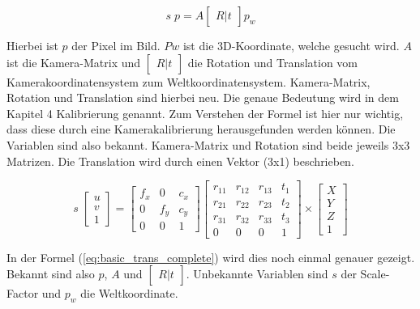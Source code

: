 	\begin{equation}
		s \; p = A \begin{bmatrix} R|t \end{bmatrix} p_w
		\label{eq:basic_trans}
	\end{equation}
	
	Hierbei ist \( p \) der Pixel im Bild. \( Pw \) ist die 3D-Koordinate, welche gesucht wird. \( A \) ist die Kamera-Matrix und \( \begin{bmatrix} R|t \end{bmatrix} \) die Rotation und Translation vom Kamerakoordinatensystem zum Weltkoordinatensystem. Kamera-Matrix, Rotation und Translation sind hierbei neu. Die genaue Bedeutung wird in dem Kapitel 4 Kalibrierung genannt. Zum Verstehen der Formel ist hier nur wichtig, dass diese durch eine Kamerakalibrierung herausgefunden werden können. Die Variablen sind also bekannt. Kamera-Matrix und Rotation sind beide jeweils 3x3 Matrizen. Die Translation wird durch einen Vektor (3x1) beschrieben. 
	
	\begin{equation}
		s \; \begin{bmatrix}
		u \\ 
		v \\ 
		1
		\end{bmatrix} = \begin{bmatrix}
		f_x & 0 & c_x \\
		0 & f_y & c_y \\
		0 & 0 & 1
		\end{bmatrix} \begin{bmatrix}
		r_{11} & r_{12} & r_{13} & t_1 \\ 
		r_{21} & r_{22} & r_{23} & t_2 \\ 
		r_{31} & r_{32} & r_{33} & t_3 \\
		0 & 0 & 0 & 1
		\end{bmatrix} \times \begin{bmatrix}
		X \\ 
		Y \\ 
		Z \\
		1
		\end{bmatrix}
		\label{eq:basic_trans_complete}
	\end{equation}
	
	In der Formel (\ref{eq:basic_trans_complete}) wird dies noch einmal genauer gezeigt. Bekannt sind also \( p \), \( A \) und \( \begin{bmatrix} R|t \end{bmatrix} \). Unbekannte Variablen sind \( s \) der Scale-Factor und \( p_w \) die Weltkoordinate.
	

